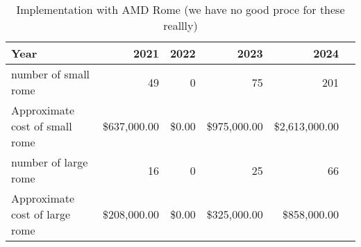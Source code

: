 \tiny \begin{longtable} { |p{}  |r  |r  |r  |r  |r |} 
\caption{Implementation with AMD Rome (we have no good proce for these reallly) \label{tab:Rome}}\\ 
\hline 
\textbf{Year}&\textbf{2021}&\textbf{2022}&\textbf{2023}&\textbf{2024} \\ \hline
{number of small rome }&{49}&{0}&{75}&{201} \\ \hline
{Approximate cost of small rome }&{\$637,000.00}&{\$0.00}&{\$975,000.00}&{\$2,613,000.00} \\ \hline
{number of large rome }&{16}&{0}&{25}&{66} \\ \hline
{Approximate cost of large rome }&{\$208,000.00}&{\$0.00}&{\$325,000.00}&{\$858,000.00} \\ \hline
\end{longtable} \normalsize
